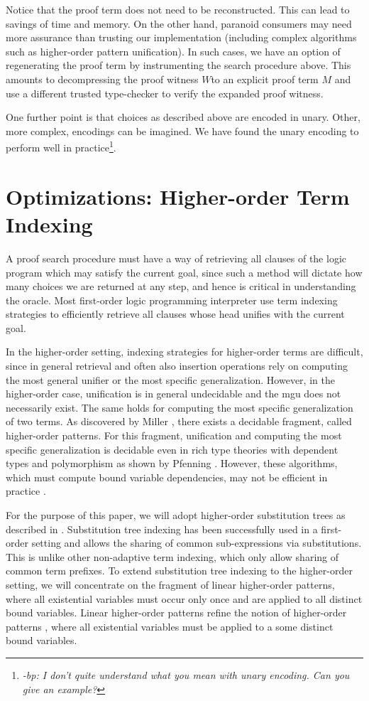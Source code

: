 \documentclass{acmconf}
\newcommand{\ednote}[1]{\footnote{\it #1}}
\begin{document}
Notice that the proof term does not need to be reconstructed. This can
lead to savings of time and memory. On the other hand, paranoid
consumers may need more assurance than trusting our implementation
(including complex algorithms such as higher-order pattern
unification). In such cases, we have an option of regenerating the
proof term by instrumenting the search procedure above.  This amounts
to decompressing the proof witness $W$to an explicit proof term $M$
and use a different trusted type-checker to verify the expanded proof
witness.

One further point is that choices as described above are encoded in
unary. Other, more complex, encodings can be imagined. We have found
the unary encoding to perform well in practice\ednote{-bp: I don't
  quite understand what you mean with unary encoding. Can you give an example?}. 

\section{Optimizations: Higher-order Term Indexing}

A proof search procedure must have a way of retrieving all clauses of
the logic program which may satisfy the current goal, since such a
method will dictate how many choices we are returned at any step, and
hence is critical in understanding the oracle. Most first-order logic
programming interpreter use term indexing strategies to efficiently
retrieve all clauses whose head unifies with the current goal.

In the higher-order setting, indexing strategies for higher-order
terms are difficult, since in general retrieval and often also
insertion operations rely on computing the most general unifier or the
most specific generalization. However, in the higher-order case,
unification is in general undecidable and the mgu does not necessarily
exist. The same holds for computing the most specific generalization
of two terms. As discovered by Miller \cite{Miller91iclp}, there exists a decidable
fragment, called higher-order patterns. For this fragment, unification
and computing the most specific generalization is decidable even in
rich type theories with dependent types and polymorphism as shown by
Pfenning \cite{Pfenning91lics}.  However, these algorithms, which must
compute bound variable dependencies, may not be efficient in practice
\cite{PientkaPfenning:CADE03}.  

For the purpose of this paper, we will adopt higher-order substitution
trees as described in \cite{Pientka:ICLP03}. Substitution tree
indexing has been successfully used in a first-order setting \cite{Graf+Book95} and
allows the sharing of common sub-expressions via substitutions. This
is unlike other non-adaptive term indexing, which only allow sharing
of common term prefixes. To extend substitution tree indexing to the
higher-order setting, we will concentrate on the fragment of linear
higher-order patterns, where all existential variables must occur only
once and are applied to all distinct bound variables. Linear
higher-order patterns refine the notion of higher-order patterns
\cite{Miller91iclp}, where all existential variables must be applied
to a some distinct bound variables. 
\end{document}
